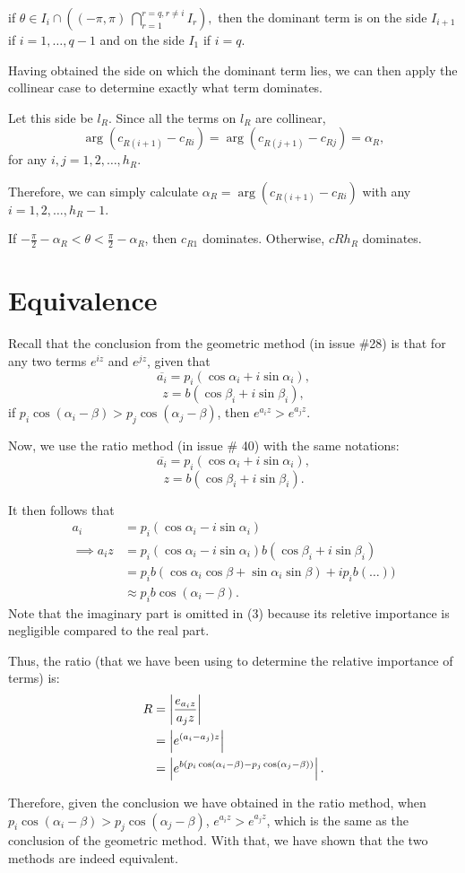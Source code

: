 \documentclass[11pt,reqno,oneside,a4paper]{article}
\begin{document}
if $\theta\in I_i \cap \left((-\pi, \pi) \ \bigcap_{r=1}^{r=q,r\neq i} I_r\right),$ then the dominant term is on the side  $I_{i+1}$ if $i = 1,\dots,q-1$ and on the side $I_1$ if $i = q$.

Having obtained the side on which the dominant term lies, we can then apply the collinear case to determine exactly what term dominates. 

Let this side be $l_R$. Since all the terms on $l_R$ are collinear, 
$$\arg(c_{R (i+1)} - c_{R i}) = \arg(c_{R (j+1)} - c_{R j}) = \alpha_R,$$
for any $i,j = 1,2,\dots, h_R$. 

Therefore, we can simply calculate $\alpha_R = \arg(c_{R (i+1)} - c_{R i})$ with any $i = 1,2,\dots, h_R - 1.$

If $-\frac{\pi}{2} -\alpha_R < \theta < \frac{\pi}{2} - \alpha_R$, then $c_{R 1}$ dominates. Otherwise, $c{R h_R}$ dominates. 

\section{Equivalence}\label{sec:eq}
Recall that the conclusion from the geometric method (in issue \#28) is that for any two terms $e^{iz}$ and $e^{jz}$, given that 
$$\overline{a_i} = p_i (\cos\alpha_i + i\sin\alpha_i),$$
$$z = b (\cos\beta_i + i\sin\beta_i),$$
if $p_i\cos(\alpha_i -\beta) > p_j\cos(\alpha_j -\beta)$, then $e^{a_iz}>e^{a_jz}$. 

Now, we use the ratio method (in issue \# 40) with the same notations:
$$\overline{a_i} = p_i (\cos\alpha_i + i\sin\alpha_i),$$
$$z = b (\cos\beta_i + i\sin\beta_i).$$

It then follows that
\begin{align}
a_i &= p_i (\cos\alpha_i - i\sin\alpha_i)\\
\implies a_i z &= p_i (\cos\alpha_i - i\sin\alpha_i)b (\cos\beta_i + i\sin\beta_i) \\
&=p_i b (\cos\alpha_i\cos\beta + \sin\alpha_i\sin\beta) + i p_i b(\dots))\\
&\approx p_i b \cos(\alpha_i -\beta).
\end{align}
Note that the imaginary part is omitted in (3) because its reletive importance is negligible compared to the real part. 

Thus, the ratio (that we have been using to determine the relative importance of terms) is:
\begin{align*}
	R &= \left\lvert\frac{e_{a_i z}}{a_j z}\right\rvert\\
	&= \left\lvert e^{(a_i-a_j)z}\right\rvert\\
	&= \left\lvert e^{b(p_i\cos(\alpha_i-\beta)-p_j\cos(\alpha_j-\beta))}\right\rvert.
\end{align*}

Therefore, given the conclusion we have obtained in the ratio method, when $p_i\cos(\alpha_i-\beta)>p_j\cos(\alpha_j-\beta)$, $e^{a_iz}>e^{a_jz}$, which is the same as the conclusion of the geometric method. With that, we have shown that the two methods are indeed equivalent. 
\end{document}
